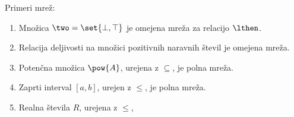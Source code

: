 \begin{primer}
  Primeri mrež:
  \begin{enumerate}
  \item Množica $\two = \set{\bot, \top}$ je omejena mreža za relacijo $\lthen$.
  \item Relacija deljivosti na množici pozitivnih naravnih števil je omejena mreža.
  \item Potenčna množica $\pow{A}$, urejena z $\subseteq$, je polna mreža.
  \item Zaprti interval $[a,b]$, urejen z $\leq$, je polna mreža.
  \item Realna števila $R$, urejena z $\leq$,
  \end{enumerate}
\end{primer}
